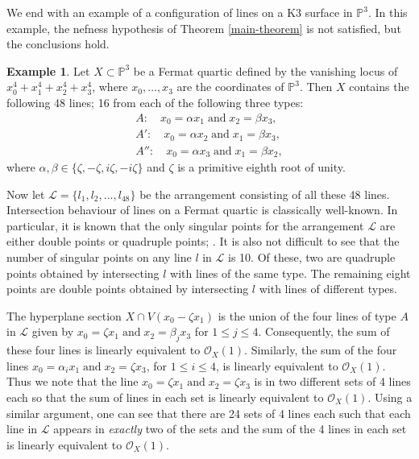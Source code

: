 \documentclass[12pt,reqno]{amsart}
\theoremstyle{plain}
\numberwithin{equation}{section}
\theoremstyle{definition}
\newtheorem{example}[theorem]{Example}
\begin{document}
We end with an example of a configuration of lines on a K3 surface in $\mathbb{P}^3$. In this example, the nefness hypothesis of Theorem \ref{main-theorem} is not satisfied, but the conclusions hold. 

\begin{example}\label{K3}
		Let $X \subset \mathbb{P}^3$ be a Fermat quartic defined by the vanishing locus of $x_0^4 + x_1^4 + x_2^4 + x_3^4$, where $x_0, \ldots, x_3$ are the coordinates of $\mathbb{P}^3$. 
		Then $X$ contains the following 48 lines; 
  16 from each of the following three types: 
		\begin{eqnarray*}
			A: \quad x_0 = \alpha x_1 \; \text{and} \; x_2 = \beta x_3, \\
			A': \quad x_0 = \alpha x_2 \; \text{and} \; x_1 = \beta x_3, \\
			A'': \quad x_0 = \alpha x_3 \; \text{and} \; x_1 = \beta x_2,
		\end{eqnarray*}
		where $\alpha, \beta \in \{\zeta, -\zeta, i\zeta, -i\zeta \}$ and $\zeta$ is a primitive eighth root of unity. %
		

Now let $\mathcal{L} = \{l_1,l_2, \ldots,  l_{48}\}$ be the arrangement consisting of all these 48 lines. 
Intersection behaviour of lines on a Fermat quartic is classically well-known. 
In particular, it is known that the only singular points for the arrangement $\mathcal{L}$ are either double points or quadruple points; \cite[Example 3.3]{Pok1}. It is also not difficult to see that the number of singular points on any line $l$ in $\mathcal{L}$ is 10. Of these, two are quadruple points obtained by intersecting $l$ with lines of the same type. The remaining eight points are double points obtained by intersecting $l$ with lines of different types. 


The hyperplane section $X \cap V(x_0 - \zeta x_1)$ is the union of the four lines of type $A$ in $\mathcal{L}$ 
given by  
$x_0 = \zeta x_1 \; \text{and} \; x_2 = \beta_j x_3$
for  $1\leq j \leq 4$. Consequently, the sum of these four lines is linearly equivalent to $\mathcal{O}_X(1)$. Similarly, the sum of the four lines 
$x_0 = \alpha_i x_1 \; \text{and} \; x_2 = \zeta x_3$, 
for $1\leq i \leq 4$, 
is linearly equivalent to $\mathcal{O}_X(1)$. Thus we note that the line 
$x_0 = \zeta x_1 \; \text{and} \; x_2 = \zeta x_3$ is in two different sets of 4 lines each so that the sum of lines in each set is linearly equivalent to $\mathcal{O}_X(1)$.
Using a similar argument, one can see that there are 24 sets of 4 lines each such that each line in $\mathcal{L}$ appears in \textit{exactly} two of the sets and the sum of the 4 lines in each set is linearly equivalent to $\mathcal{O}_X(1)$.



\end{example}
\end{document}
